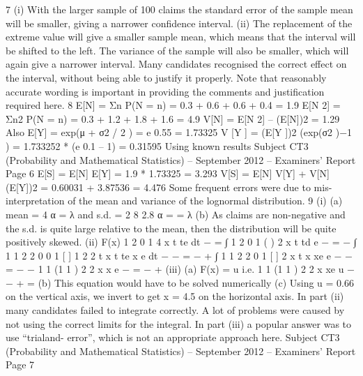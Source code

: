 7 (i) With the larger sample of 100 claims the standard error of the sample mean
will be smaller, giving a narrower confidence interval.
(ii) The replacement of the extreme value will give a smaller sample mean, which
means that the interval will be shifted to the left.
The variance of the sample will also be smaller, which will again give a
narrower interval.
Many candidates recognised the correct effect on the interval, without being able to justify it
properly. Note that reasonably accurate wording is important in providing the comments and
justification required here.
8 E[N] = Σn P(N = n) = 0.3 + 0.6 + 0.6 + 0.4 = 1.9
E[N 2] = Σn2 P(N = n) = 0.3 + 1.2 + 1.8 + 1.6 = 4.9
V[N] = E[N 2] – (E[N])2 = 1.29
Also E[Y] = exp(μ + σ2 / 2 ) = e 0.55 = 1.73325
V [Y ] = (E[Y ])2 (exp(σ2 )−1 ) = 1.733252 * (e 0.1 – 1) = 0.31595
Using known results
Subject CT3 (Probability and Mathematical Statistics) – September 2012 – Examiners’ Report
Page 6
E[S] = E[N] E[Y] = 1.9 * 1.73325 = 3.293
V[S] = E[N] V[Y] + V[N] (E[Y])2 = 0.60031 + 3.87536 = 4.476
Some frequent errors were due to mis-interpretation of the mean and variance of the lognormal
distribution.
9 (i) (a) mean = 4
α
=
  λ
and s.d. = 2 8 2.8
α
= =
  λ
(b) As claims are non-negative and the s.d. is quite large relative to the
mean, then the distribution will be quite positively skewed.
(ii) F(x)
1
2
0
1
4
x t
te dt
−
= ∫
1
2
0
1 ( )
2
x t
td e
−
= − ∫
1 1
2 2
0
0
1 [ ] 1
2 2
t x t te x e dt
− −
= − + ∫
1 1
2 2
0
1 [ ]
2
x t x xe e
− −
= − −
1
1 (1 1 ) 2
2
x
x e
−
= − +
  (iii) (a) F(x) = u i.e.
1
1 (1 1 ) 2
2
x
xe u
−
− + =
  (b) This equation would have to be solved numerically
(c) Using u = 0.66 on the vertical axis, we invert to get x = 4.5 on the
horizontal axis.
In part (ii) many candidates failed to integrate correctly. A lot of problems were caused by
not using the correct limits for the integral. In part (iii) a popular answer was to use “trialand-
  error”, which is not an appropriate approach here.
Subject CT3 (Probability and Mathematical Statistics) – September 2012 – Examiners’ Report
Page 7
